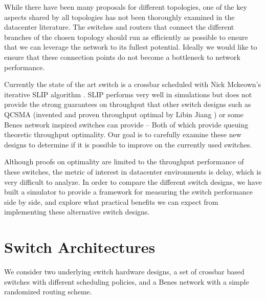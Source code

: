 \documentclass{IEEEtran}%
\begin{document}
While there have been many proposals for different topologies, one of the key aspects shared by all topologies has not been thoroughly examined in the datacenter literature.  The switches and routers that connect the different branches of the chosen topology should run as efficiently as possible to ensure that we can leverage the network to its fullest potential.  Ideally we would like to ensure that these connection points do not become a bottleneck to network performance.

  Currently the state of the art switch is a crossbar scheduled with Nick Mckeown's iterative SLIP algorithm \cite{McKeown}.  SLIP performs very well in simulations but does not provide the strong guarantees on throughput that other switch designs such as QCSMA (invented and proven throughput optimal by Libin Jiang \cite{Libin}) or some Benes network inspired switches \cite{Walrand_Varaiya} can provide -- {Both of which provide queuing theoretic throughput optimality.}   Our goal is to carefully examine these new designs to determine if it is possible to improve on the currently used switches.

Although proofs on optimality are limited to the throughput performance of these switches, the metric of interest in datacenter environments is delay, which is very difficult to analyze.  In order to compare the different switch designs, we have built a simulator to provide a framework for measuring the switch performance side by side, and explore what practical benefits we can expect from implementing these alternative switch designs.



\section{Switch Architectures}
We consider two underlying switch hardware designs, a set of crossbar based switches with different scheduling policies, and a Benes network with a simple randomized routing scheme.%
\end{document}
